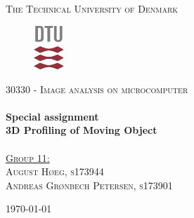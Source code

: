 \begin{titlepage}
\begin{center}
\textsc{\LARGE The Technical University of Denmark}\\[0.5cm]
\begin{figure}[h]
\centering
\includegraphics[width=0.10\textwidth]{figures/DTU-logo.png}~\\[1cm]
\end{figure}
\textsc{\LARGE 30330 - Image analysis on microcomputer}\\[0.5cm] %
\HRule \\[0.2cm]
{\huge\bfseries Special assignment\\[0.4cm]} %
{ \large \bfseries 3D Profiling of Moving Object}\\[0.2cm] %
\HRule\\[0.2 cm]

\vspace{11cm}
\underline{\textsc{\large Group 11:}}\\
\textsc{\large August Høeg, s173944}\\
\textsc{\large Andreas Grønbech Petersen, s173901}\\


\vspace{0.1cm}

\vfill
\vspace{0.5cm}
\centering\today
\end{center}
\end{titlepage}